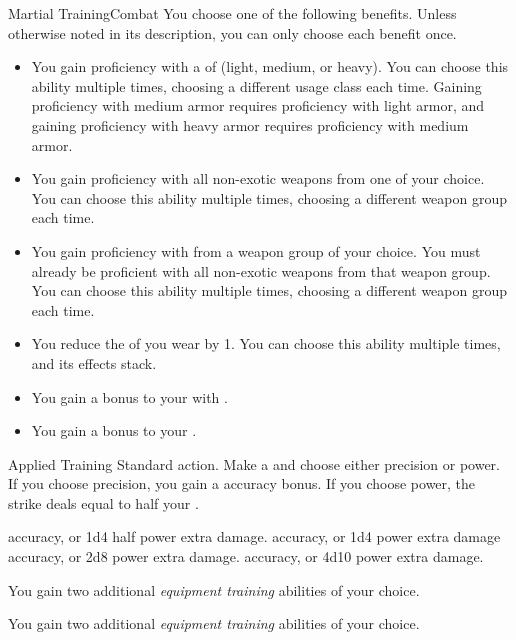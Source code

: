   \begin{feat}{Martial Training}{Combat}
     You choose one of the following benefits.
    Unless otherwise noted in its description, you can only choose each benefit once.
    \begin{itemize}
      \item You gain proficiency with a  of  (light, medium, or heavy).
        You can choose this ability multiple times, choosing a different usage class each time.
        Gaining proficiency with medium armor requires proficiency with light armor, and gaining proficiency with heavy armor requires proficiency with medium armor.
      \item You gain proficiency with all non-exotic weapons from one  of your choice.
        You can choose this ability multiple times, choosing a different weapon group each time.
      \item You gain proficiency with  from a weapon group of your choice.
        You must already be proficient with all non-exotic weapons from that weapon group.
        You can choose this ability multiple times, choosing a different weapon group each time.
      \item You reduce the  of  you wear by 1.
        You can choose this ability multiple times, and its effects stack.
      \item You gain a  bonus to your  with .
      \item You gain a  bonus to your .
    \end{itemize}

    \begin{activeability}{Applied Training}
      \abilityusagetime Standard action.
      \rankline
      Make a  and choose either precision or power.
      If you choose precision, you gain a  accuracy bonus.
      If you choose power, the strike deals  equal to half your .

      \rankline
        accuracy, or 1d4 \add half power extra damage.
        accuracy, or 1d4 \add power extra damage
        accuracy, or 2d8 \add power extra damage.
        accuracy, or 4d10 \add power extra damage.
    \end{activeability}

     You gain two additional \textit{equipment training} abilities of your choice.

     You gain two additional \textit{equipment training} abilities of your choice.
  \end{feat}

